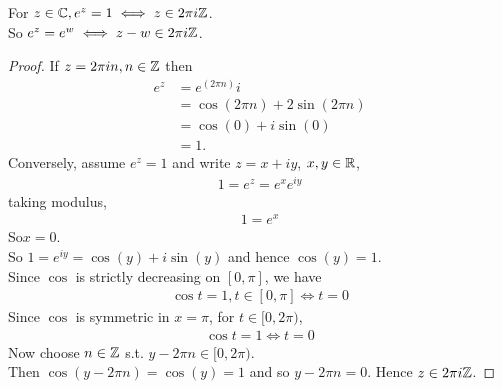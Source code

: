 \documentclass[a4paper]{article}
\begin{document}
\begin{prop}
For $z\in\mathbb{C},e^z=1 \iff z\in2\pi i \mathbb{Z}$.\\
So $e^z = e^w \iff z-w\in2\pi i\mathbb{Z}$.
\begin{proof}
If $z=2\pi in,n\in \mathbb{Z}$ then
\begin{equation*}
\begin{aligned}
e^z &= e^{\left(2\pi n\right)}i\\
&= \cos\left(2\pi n\right)+2\sin\left(2\pi n\right)\\
&= \cos\left(0\right)+i\sin\left(0\right)\\
&=1.
\end{aligned}
\end{equation*}
Conversely, assume $e^z=1$ and write $z=x+iy$, $x,y\in\mathbb{R}$,
\begin{equation*}
\begin{aligned}
1=e^z=e^x e^{iy}
\end{aligned}
\end{equation*}
taking modulus,
\begin{equation*}
\begin{aligned}
1=e^x
\end{aligned}
\end{equation*}
So$x=0$.\\
So $1=e^{iy}=\cos\left(y\right)+i\sin\left(y\right)$ and hence $\cos\left(y\right) = 1$.\\
Since $\cos$ is strictly decreasing on $[0,\pi]$, we have
\begin{equation*}
\begin{aligned}
\cos t = 1, t\in[0,\pi] \iff t=0
\end{aligned}
\end{equation*}
Since $\cos$ is symmetric in $x=\pi$, for $t\in[0,2\pi)$,
\begin{equation*}
\begin{aligned}
\cos t=1 \iff t=0
\end{aligned}
\end{equation*}
Now choose $n\in\mathbb{Z}$ s.t. $y-2\pi n\in[0,2\pi)$.\\
Then $\cos\left(y-2\pi n\right)=\cos\left(y\right)=1$ and so $y-2\pi n = 0$. Hence $z\in 2\pi i\mathbb{Z}$.
\end{proof}
\end{prop}
\end{document}

